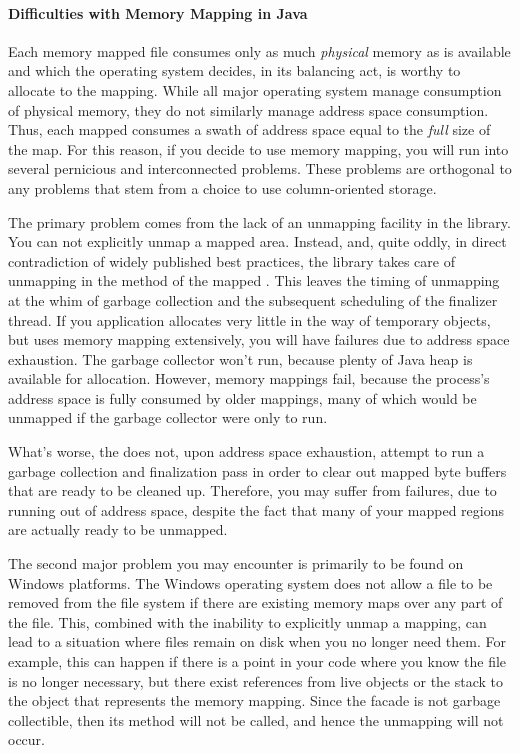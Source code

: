  

\paragraph{Difficulties with Memory Mapping in Java}

Each memory mapped file consumes only as much \emph{physical} memory as is
available and which the operating system decides, in its balancing act, is worthy
to allocate to the mapping. While all major operating system manage consumption
of physical memory, they do not similarly manage address space consumption. Thus,
each mapped  consumes a swath of address space equal to the
\emph{full} size of the map. For this reason, if you decide to use memory
mapping, you will run into several pernicious and interconnected problems. These
problems are orthogonal to any problems that stem from a choice to use
column-oriented storage.

The primary problem comes from the lack of an unmapping facility in the
 library. You can not explicitly unmap a mapped area. Instead,
and, quite oddly, in direct contradiction of widely published best practices, the
library takes care of unmapping in the  method of the mapped
. This leaves the timing of unmapping at the whim of garbage
collection and the subsequent scheduling of the finalizer thread. If you
application allocates very little in the way of temporary objects, but uses
memory mapping extensively, you will have failures due to address space
exhaustion. The garbage collector won't run, because plenty of Java heap is
available for allocation. However, memory mappings fail, because the process's
address space is fully consumed by older mappings, many of which would be
unmapped if the garbage collector were only to run.

What's worse, the \jre does not, upon address space exhaustion, attempt to run a
garbage collection and finalization pass in order to clear out mapped byte
buffers that are ready to be cleaned up. Therefore, you may suffer from
 failures,
due to running out of address space, despite the fact that many of your mapped
regions are actually ready to be unmapped.

The second major problem you may encounter is primarily to be found on Windows
platforms. The Windows operating system does not allow a file to be removed from
the file system if there are existing memory maps over any part of the file.
This, combined with the inability to explicitly unmap a mapping, can lead to a
situation where files remain on disk when you no longer need them. For example,
this can happen if there is a point in your code where you know the file is no
longer necessary, but there exist references from live objects or the stack to
the  object that represents the memory mapping. Since the
 facade is not garbage collectible, then its 
method will not be called, and hence the unmapping will not occur.

